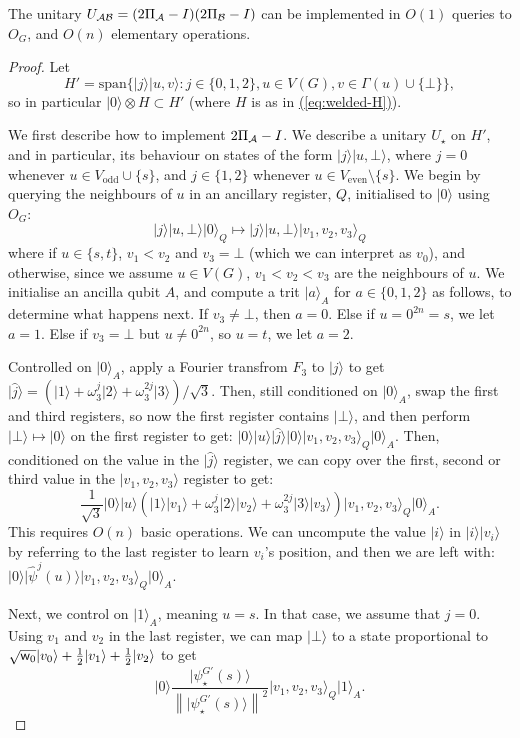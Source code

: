 \documentclass{theoretics}
\newcommand{\eq}[1]{\hyperref[eq:#1]{(\ref*{eq:#1})}}
\def\ket#1{{\lvert}#1\rangle}
\renewcommand{\>}{\rangle}
\newcommand{\<}{\langle}
\renewcommand{\(}{\left(}
\renewcommand{\)}{\right)}
\def\norm#1{\left\| #1 \right\|}
\def\w{{\sf w}}
\begin{document}
\begin{lemma}\label{lem:welded-U}
The unitary $U_{\cal AB}=(2\Pi_{\cal A}-I)(2\Pi_{\cal B}-I)$ can be implemented in $O(1)$ queries to $O_G$, and $O(n)$ elementary operations.
\end{lemma}
\begin{proof}
Let 
$$H'=\mathrm{span}\{\ket{j}\ket{u,v}:j\in\{0,1,2\},u\in V(G),v\in \Gamma(u)\cup\{\bot\}\},$$
so in particular $\ket{0}\otimes H\subset H'$ (where $H$ is as in \eq{welded-H}).

We first describe how to implement $2\Pi_{\cal A}-I$. 
We describe a unitary $U_\star$ on $H'$, and in particular, its behaviour on states of the form $\ket{j}\ket{u,\bot}$, where $j=0$ whenever $u\in V_{\mathrm{odd}}\cup\{s\}$, and $j\in\{1,2\}$ whenever $u\in V_{\mathrm{even}}\setminus \{s\}$. We begin by querying the neighbours of $u$ in an ancillary register, $Q$, initialised to $\ket{0}$ using $O_G$:
$$\ket{j}\ket{u,\bot}\ket{0}_Q\mapsto \ket{j}\ket{u,\bot}\ket{v_1,v_2,v_3}_Q$$
where if $u\in \{s,t\}$, $v_1<v_2$ and $v_3=\bot$ (which we can interpret as $v_0$), and otherwise, since we assume $u\in V(G)$, $v_1<v_2<v_3$ are the neighbours of $u$. 
We initialise an ancilla qubit $A$, and compute a trit $\ket{a}_A$ for $a\in\{0,1,2\}$ as follows, to determine what happens next. If $v_3\neq \bot$, then $a=0$. Else if $u=0^{2n}=s$, we let $a=1$. Else if $v_3=\bot$ but $u\neq 0^{2n}$, so $u=t$, we let $a=2$. 

Controlled on $\ket{0}_A$, apply a Fourier transfrom $F_3$ to $\ket{j}$ to get $\ket{\hat{j}}=(\ket{1}+\omega_3^j\ket{2}+\omega_3^{2j}\ket{3})/\sqrt{3}$. Then, still conditioned on $\ket{0}_A$, swap the first and third registers, so now the first register contains $\ket{\bot}$, and then perform $\ket{\bot}\mapsto \ket{0}$ on the first register to get:
$\ket{0}\ket{u}\ket{\hat{j}}\ket{0}\ket{v_1,v_2,v_3}_Q\ket{0}_A.$
Then, conditioned on the value in the $\ket{\hat{j}}$ register, we can copy over the first, second or third value in the $\ket{v_1,v_2,v_3}$ register to get:
$$\frac{1}{\sqrt{3}}\ket{0}\ket{u}\left(\ket{1}\ket{v_1}+\omega_3^j\ket{2}\ket{v_2}+\omega_3^{2j}\ket{3}\ket{v_3}\right)\ket{v_1,v_2,v_3}_Q\ket{0}_A.$$
This requires $O(n)$ basic operations. 
We can uncompute the value $\ket{i}$ in $\ket{i}\ket{v_i}$ by referring to the last register to learn $v_i$'s position, and then we are left with:
$\ket{0}\ket{\widehat{\psi}^j(u)}\ket{v_1,v_2,v_3}_Q\ket{0}_A.$

Next, we control on $\ket{1}_A$, meaning $u=s$. In that case, we assume that $j=0$. 
Using $v_1$ and $v_2$ in the last register, we can map $\ket{\bot}$ to a state proportional to 
$\sqrt{\w_0}\ket{v_0}+\frac{1}{2}\ket{v_1}+\frac{1}{2}\ket{v_2}$
to get
$$\ket{0}\frac{\ket{{\psi}^{G'}_\star(s)}}{\norm{\ket{{\psi}^{G'}_\star(s)}}^2}\ket{v_1,v_2,v_3}_Q\ket{1}_A.$$


\end{proof}
\end{document}
